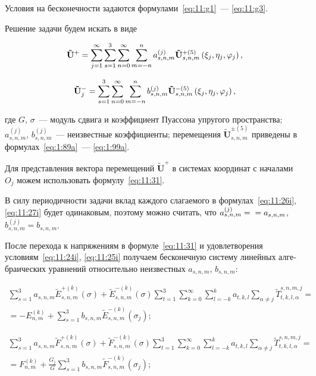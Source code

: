 \begin{russian}
\noindent Условия на бесконечности задаются формулами~\eqref{eq:11:g1}~--- \eqref{eq:11:g3}.

Решение задачи будем искать в виде

\begin{equation}
{\bf{\tilde U^+}} = \sum\limits_{j = 1}^\infty {\sum\limits_{s = 1}^3 {\sum\limits_{n = 0}^\infty  {\sum\limits_{m=-n}^{n} {a_{s,n,m}^{(j)}} } } } {\bf{\tilde U}}_{s,n,m}^{ + (5)}\left( {{\xi_j},{\eta _j},{\varphi _j}} \right),
\label{eq:11:26i}
\end{equation}

\begin{equation}
\mathbf{\tilde U}_j^- = {\sum\limits_{s = 1}^3 {\sum\limits_{n = 0}^\infty  {\sum\limits_{m=-n}^{n} {b_{s,n,m}^{(j)}} } } } {\bf{\tilde U}}_{s,n,m}^{ - (5)}\left( {{\xi_j},{\eta _j},{\varphi _j}} \right),
\label{eq:11:27i}
\end{equation}

\noindent где $G$, $\sigma$~--- модуль сдвига и коэффициент Пуассона упругого пространства; $a_{s,n,m}^{(j)}$, $b_{s,n,m}^{(j)}$~--- неизвестные коэффициенты; перемещения $\mathbf{\tilde U}_{s,n,m}^{\pm(5)}$ приведены в формулах~\eqref{eq:1:89a}~--- \eqref{eq:1:99a}.

Для представления вектора перемещений $\mathbf{\tilde U}^+$ в системах координат с началами $O_j$ можем использовать формулу~\eqref{eq:11:31}.

В силу периодичности задачи вклад каждого слагаемого в формулах~\eqref{eq:11:26i}, \eqref{eq:11:27i} будет одинаковым, поэтому можно считать, что $a_{s,n,m}^{(j)}=\\=a_{s,n,m}$, $b_{s,n,m}^{(j)}=b_{s,n,m}$.

После перехода к напряжениям в формуле~\eqref{eq:11:31} и удовлетворения условиям~\eqref{eq:11:24i}, \eqref{eq:11:25i} получаем бесконечную систему линейных алгебраических уравнений относительно неизвестных $a_{s,n,m}$, $b_{s,n,m}$:

\begin{multline}
\sum\limits_{s=1}^3 a_{s,n,m}\tilde E_{s,n,m}^{+(k)}(\sigma)+\tilde E_{s,n,m}^{-(k)}(\sigma)\sum\limits_{t=1}^3\sum\limits_{k=0}^\infty\sum\limits_{l=-k}^k a_{t,k,l}\sum\limits_{\alpha\neq j}\tilde T_{t,k,l,\alpha}^{s,n,m,j}= \\
=-E_{n,m}^{(k)}+\sum\limits_{s=1}^3 b_{s,n,m}\tilde E_{s,n,m}^{-(k)}(\sigma_j);
\label{eq:11:28i}
\end{multline}

\begin{multline}
\sum\limits_{s=1}^3 a_{s,n,m}\tilde F_{s,n,m}^{+(k)}(\sigma)+\tilde F_{s,n,m}^{-(k)}(\sigma)\sum\limits_{t=1}^3\sum\limits_{k=0}^\infty\sum\limits_{l=-k}^k a_{t,k,l}\sum\limits_{\alpha\neq j}\tilde T_{t,k,l,\alpha}^{s,n,m,j}= \\
=F_{n,m}^{(k)}+\frac{G_j}{G}\sum\limits_{s=1}^3 b_{s,n,m}\tilde F_{s,n,m}^{-(k)}(\sigma_j);
\label{eq:11:29i}
\end{multline}


\end{russian}

